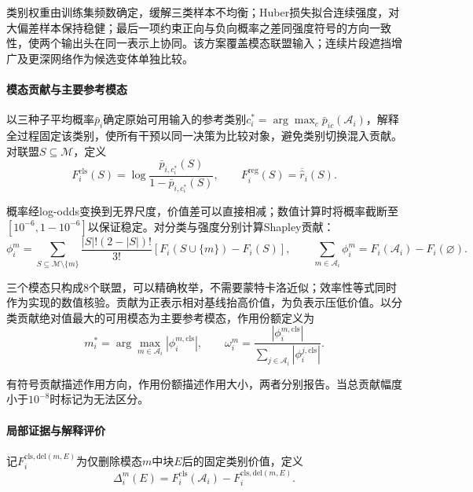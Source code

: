 类别权重由训练集频数确定，缓解三类样本不均衡；Huber损失拟合连续强度，对大偏差样本保持稳健；最后一项约束正向与负向概率之差同强度符号的方向一致性，使两个输出头在同一表示上协同。该方案覆盖模态联盟输入；连续片段遮挡增广及更深网络作为候选变体单独比较。

\FloatBarrier
\paragraph{模态贡献与主要参考模态}
以三种子平均概率$\bar p_i$确定原始可用输入的参考类别$c_i^*=\arg\max_c\bar p_{ic}(\mathcal A_i)$，解释全过程固定该类别，使所有干预以同一决策为比较对象，避免类别切换混入贡献。对联盟$S\subseteq\mathcal M$，定义
\begin{equation}
F_i^{\mathrm{cls}}(S)=\log\frac{\bar p_{i,c_i^*}(S)}{1-\bar p_{i,c_i^*}(S)},\qquad
F_i^{\mathrm{reg}}(S)=\overline{\widehat r}_i(S).
\end{equation}

概率经log-odds变换到无界尺度，价值差可以直接相减；数值计算时将概率截断至$[10^{-6},1-10^{-6}]$以保证稳定。对分类与强度分别计算Shapley贡献：
\begin{equation}
\phi_i^m=\sum_{S\subseteq\mathcal M\setminus\{m\}}\frac{|S|!(2-|S|)!}{3!}
\left[F_i(S\cup\{m\})-F_i(S)\right],\qquad
\sum_{m\in\mathcal A_i}\phi_i^m=F_i(\mathcal A_i)-F_i(\varnothing).
\end{equation}

三个模态只构成8个联盟，可以精确枚举，不需要蒙特卡洛近似；效率性等式同时作为实现的数值核验。贡献为正表示相对基线抬高价值，为负表示压低价值。以分类贡献绝对值最大的可用模态为主要参考模态，作用份额定义为
\begin{equation}
m_i^*=\arg\max_{m\in\mathcal A_i}|\phi_i^{m,\mathrm{cls}}|,\qquad
\omega_i^m=\frac{|\phi_i^{m,\mathrm{cls}}|}{\sum_{j\in\mathcal A_i}|\phi_i^{j,\mathrm{cls}}|}.
\end{equation}

有符号贡献描述作用方向，作用份额描述作用大小，两者分别报告。当总贡献幅度小于$10^{-8}$时标记为无法区分。

\FloatBarrier
\paragraph{局部证据与解释评价}
记$F_i^{\mathrm{cls,del}(m,E)}$为仅删除模态$m$中块$E$后的固定类别价值，定义
\begin{equation}
\Delta_i^m(E)=F_i^{\mathrm{cls}}(\mathcal A_i)-F_i^{\mathrm{cls,del}(m,E)}.
\end{equation}

